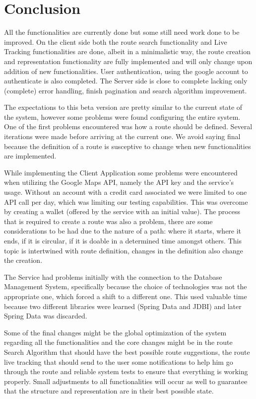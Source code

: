 \chapter{Conclusion}
All the functionalities are currently done but some still need work done to be improved. 
On the client side both the route search functionality and Live Tracking functionalities are done, albeit in a minimalistic way,
the route creation and representation functionality are fully implemented and will only change upon addition of new functionalities.
User authentication, using the google account to authenticate is also completed. 
The Server side is close to complete lacking only (complete) error handling, finish pagination and search algorithm improvement. 

The expectations to this beta version are pretty similar to the current state of the system, however some problems were found configuring the entire system.
One of the first problems encountered was how a route should be defined. Several iterations were made before arriving at the current one. We avoid saying final
because the definition of a route is susceptive to change when new functionalities are implemented.

While implementing the Client Application some problems were encountered when utilizing the Google Maps API, namely the API key and the service's usage. 
Without an account with a credit card associated we were limited to one API call per day, which was limiting our testing capabilities. This was overcome by creating a wallet (offered by the service with an initial value).
The process that is required to create a route was also a problem, there are some considerations to be had due to the nature of a path: where it starts, 
where it ends, if it is circular, if it is doable in a determined time amongst others.
This topic is intertwined with route definition, changes in the definition also change the creation.

The Service had problems initially with the connection to the Database Management System, specifically because the choice of technologies was not the appropriate one, which
forced a shift to a different one. This used valuable time because two different libraries were learned (Spring Data and JDBI) and later Spring Data was discarded.

Some of the final changes might be the global optimization of the system regarding all the functionalities and the core changes might be in the route Search Algorithm that should have the best
possible route suggestions, the route live tracking that should send to the user some notifications to help him go through the route and reliable system tests to ensure that 
everything is working properly. Small adjustments to all functionalities will occur as well to guarantee that the structure and representation are in their best possible state.